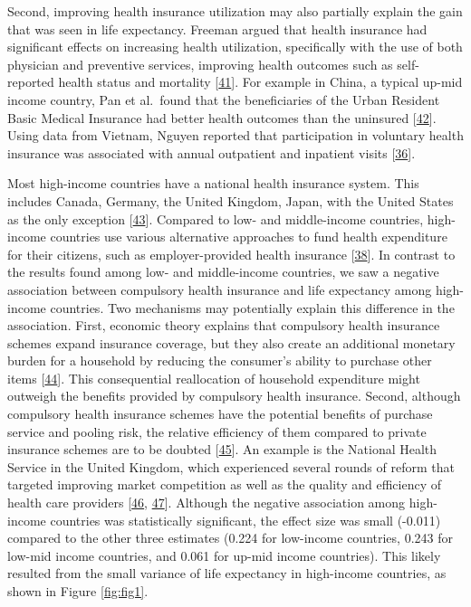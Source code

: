 \documentclass[]{elsarticle} %
\begin{document}
Second, improving health insurance utilization may also partially explain the gain that was seen in life expectancy.
Freeman argued that health insurance had significant effects on increasing health utilization, specifically with the use of both physician and preventive services, improving health outcomes such as self-reported health status and mortality {[}\protect\hyperlink{ref-Freeman2008}{41}{]}.
For example in China, a typical up-mid income country, Pan et al.~found that the beneficiaries of the Urban Resident Basic Medical Insurance had better health outcomes than the uninsured {[}\protect\hyperlink{ref-Pan2016}{42}{]}.
Using data from Vietnam, Nguyen reported that participation in voluntary health insurance was associated with annual outpatient and inpatient visits {[}\protect\hyperlink{ref-Nguyen2012}{36}{]}.

Most high-income countries have a national health insurance system. This includes Canada, Germany, the United Kingdom, Japan, with the United States as the only exception {[}\protect\hyperlink{ref-Emery2010}{43}{]}.
Compared to low- and middle-income countries, high-income countries use various alternative approaches to fund health expenditure for their citizens, such as employer-provided health insurance {[}\protect\hyperlink{ref-lagomarsino2012moving}{38}{]}.
In contrast to the results found among low- and middle-income countries, we saw a negative association between compulsory health insurance and life expectancy among high-income countries. Two mechanisms may potentially explain this difference in the association. First, economic theory explains that compulsory health insurance schemes expand insurance coverage, but they also create an additional monetary burden for a household by reducing the consumer's ability to purchase other items {[}\protect\hyperlink{ref-koch2010health}{44}{]}.
This consequential reallocation of household expenditure might outweigh the benefits provided by compulsory health insurance. Second, although compulsory health insurance schemes have the potential benefits of purchase service and pooling risk, the relative efficiency of them compared to private insurance schemes are to be doubted {[}\protect\hyperlink{ref-savedoff2012political}{45}{]}.
An example is the National Health Service in the United Kingdom, which experienced several rounds of reform that targeted improving market competition as well as the quality and efficiency of health care providers {[}\protect\hyperlink{ref-bevan2011does}{46}, \protect\hyperlink{ref-gaynor2013death}{47}{]}.
Although the negative association among high-income countries was statistically significant, the effect size was small (-0.011) compared to the other three estimates (0.224 for low-income countries, 0.243 for low-mid income countries, and 0.061 for up-mid income countries). This likely resulted from the small variance of life expectancy in high-income countries, as shown in Figure \ref{fig:fig1}.
\end{document}
